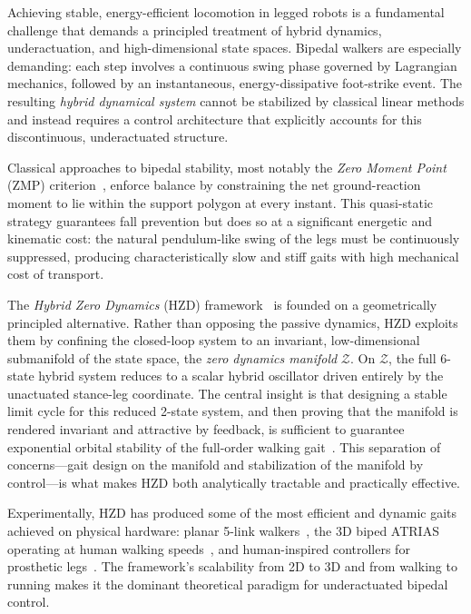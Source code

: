\documentclass[conference]{IEEEtran}
\begin{document}
Achieving stable, energy-efficient locomotion in legged robots is a fundamental challenge that demands a principled treatment of hybrid dynamics, underactuation, and high-dimensional state spaces. Bipedal walkers are especially demanding: each step involves a continuous swing phase governed by Lagrangian mechanics, followed by an instantaneous, energy-dissipative foot-strike event. The resulting \emph{hybrid dynamical system} cannot be stabilized by classical linear methods and instead requires a control architecture that explicitly accounts for this discontinuous, underactuated structure.

Classical approaches to bipedal stability, most notably the \emph{Zero Moment Point} (ZMP) criterion~\cite{hirai1998}, enforce balance by constraining the net ground-reaction moment to lie within the support polygon at every instant. This quasi-static strategy guarantees fall prevention but does so at a significant energetic and kinematic cost: the natural pendulum-like swing of the legs must be continuously suppressed, producing characteristically slow and stiff gaits with high mechanical cost of transport.

The \emph{Hybrid Zero Dynamics} (HZD) framework~\cite{westervelt,grizzle} is founded on a geometrically principled alternative. Rather than opposing the passive dynamics, HZD exploits them by confining the closed-loop system to an invariant, low-dimensional submanifold of the state space, the \emph{zero dynamics manifold} $\mathcal{Z}$. On $\mathcal{Z}$, the full 6-state hybrid system reduces to a scalar hybrid oscillator driven entirely by the unactuated stance-leg coordinate. The central insight is that designing a stable limit cycle for this reduced 2-state system, and then proving that the manifold is rendered invariant and attractive by feedback, is sufficient to guarantee exponential orbital stability of the full-order walking gait~\cite{westervelt}. This separation of concerns---gait design on the manifold and stabilization of the manifold by control---is what makes HZD both analytically tractable and practically effective.

Experimentally, HZD has produced some of the most efficient and dynamic gaits achieved on physical hardware: planar 5-link walkers~\cite{grizzle,plestan2003}, the 3D biped ATRIAS operating at human walking speeds~\cite{ramezani2013}, and human-inspired controllers for prosthetic legs~\cite{ames}. The framework's scalability from 2D to 3D and from walking to running makes it the dominant theoretical paradigm for underactuated bipedal control.
\end{document}
